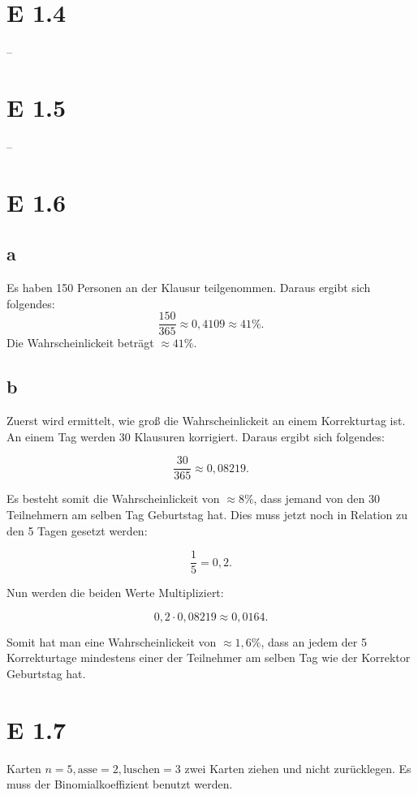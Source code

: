 \documentclass[12pt]{article}
\begin{document}
\section{E 1.4}
--

\section{E 1.5}
--


\section{E 1.6}
\subsection{a}
Es haben 150 Personen an der Klausur teilgenommen. Daraus ergibt sich folgendes:
\begin{equation}
\frac{150}{365} \approx 0,4109 \approx 41 \%.
\end{equation}
Die Wahrscheinlickeit beträgt $\approx 41\%$.

\subsection{b}
Zuerst wird ermittelt, wie groß die Wahrscheinlickeit an einem Korrekturtag ist. An einem Tag werden
30 Klausuren korrigiert. Daraus ergibt sich folgendes:

\begin{equation}
\frac{30}{365} \approx 0,08219. 
\end{equation}

Es besteht somit die Wahrscheinlickeit von $\approx 8\%$, dass jemand von den 30 Teilnehmern am
selben Tag Geburtstag hat. Dies muss jetzt noch in Relation zu den 5 Tagen gesetzt werden:

\begin{equation}
\frac{1}{5} = 0,2.
\end{equation}


Nun werden die beiden Werte Multipliziert:

\begin{equation}
0,2 \cdot 0,08219 \approx 0,0164.
\end{equation}

Somit hat man eine Wahrscheinlickeit von $\approx 1,6\%$, dass an jedem der 5 Korrekturtage mindestens
einer der Teilnehmer am selben Tag wie der Korrektor Geburtstag hat.

\section{E 1.7}
Karten $n=5, \text{asse}=2, \text{luschen}=3$ zwei Karten ziehen und nicht zurücklegen. Es muss der Binomialkoeffizient
benutzt werden.
\end{document}
